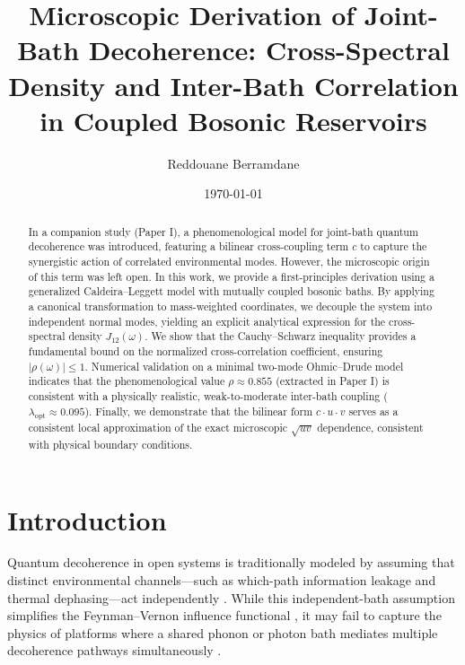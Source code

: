 \documentclass[aps,pra,reprint,amsmath,amssymb,superscriptaddress]{revtex4-2}
\begin{document}
\title{Microscopic Derivation of Joint-Bath Decoherence: Cross-Spectral Density and Inter-Bath Correlation in Coupled Bosonic Reservoirs}

\author{Reddouane Berramdane}

\date{\today}

\begin{abstract}
In a companion study (Paper I), a phenomenological model for joint-bath quantum decoherence was introduced, featuring a bilinear cross-coupling term $c$ to capture the synergistic action of correlated environmental modes. However, the microscopic origin of this term was left open. In this work, we provide a first-principles derivation using a generalized Caldeira--Leggett model with mutually coupled bosonic baths. By applying a canonical transformation to mass-weighted coordinates, we decouple the system into independent normal modes, yielding an explicit analytical expression for the cross-spectral density $J_{12}(\omega)$. We show that the Cauchy--Schwarz inequality provides a fundamental bound on the normalized cross-correlation coefficient, ensuring $|\rho(\omega)| \leq 1$. Numerical validation on a minimal two-mode Ohmic--Drude model indicates that the phenomenological value $\rho \approx 0.855$ (extracted in Paper I) is consistent with a physically realistic, weak-to-moderate inter-bath coupling ($\lambda_{\text{opt}} \approx 0.095$). Finally, we demonstrate that the bilinear form $c \cdot u \cdot v$ serves as a consistent local approximation of the exact microscopic $\sqrt{uv}$ dependence, consistent with physical boundary conditions.
\end{abstract}

\maketitle

\section{Introduction}
Quantum decoherence in open systems is traditionally modeled by assuming that distinct environmental channels---such as which-path information leakage and thermal dephasing---act independently \cite{Breuer2002, Weiss2012}. While this independent-bath assumption simplifies the Feynman--Vernon influence functional \cite{Feynman1963}, it may fail to capture the physics of platforms where a shared phonon or photon bath mediates multiple decoherence pathways simultaneously \cite{Hornberger2003}. 
\end{document}
